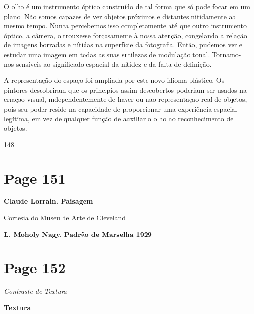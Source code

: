 \documentclass[a4paper]{article}
\begin{document}
O olho é um instrumento óptico construído de tal forma que só pode focar em um plano. Não somos capazes de ver objetos próximos e distantes nitidamente ao mesmo tempo. Nunca percebemos isso completamente até que outro instrumento óptico, a câmera, o trouxesse forçosamente à nossa atenção, congelando a relação de imagens borradas e nítidas na superfície da fotografia. Então, pudemos ver e estudar uma imagem em todas as suas sutilezas de modulação tonal. Tornamo-nos sensíveis ao significado espacial da nitidez e da falta de definição.

A representação do espaço foi ampliada por este novo idioma plástico. Os pintores descobriram que os princípios assim descobertos poderiam ser usados na criação visual, independentemente de haver ou não representação real de objetos, pois seu poder reside na capacidade de proporcionar uma experiência espacial legítima, em vez de qualquer função de auxiliar o olho no reconhecimento de objetos.

148

\newpage
\section*{Page 151}

\textbf{Claude Lorrain. Paisagem}\par
Cortesia do Museu de Arte de Cleveland\par
\vspace{5cm}

\begin{center}
\textbf{L. Moholy Nagy. Padrão de Marselha 1929}
\end{center}
\vspace{6cm}


\newpage
\section*{Page 152}

\par\noindent
\textit{Contraste de Textura \textbullet}

\vspace{2em} 

\par\noindent
\large\textbf{Textura}
\end{document}
